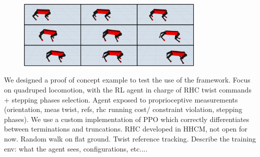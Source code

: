 \begin{Large}
\vskip1cm
\begin{figure}[h]
	\includegraphics[width=0.8\textwidth]{docs/imgs/proof_of_concept.pdf}
\end{figure}
{\Large We designed a proof of concept example to test the use of the framework. Focus on quadruped locomotion, with the RL agent in charge of RHC twist commands + stepping phases selection. Agent exposed to proprioceptive measurements (orientation, meas twist, refs, rhc running cost/ constraint violation, stepping phases). We use a custom implementation of PPO which correctly differentiates between terminations and truncations. RHC developed in HHCM, not open for now. Random walk on flat ground. Twist reference tracking. Describe the training env: what the agent sees, configurations, etc....}
\end{Large}

	